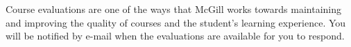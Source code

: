 Course evaluations are one of the ways that McGill works towards
maintaining and improving the quality of courses and the student’s
learning experience. You will be notified by e-mail when the
evaluations are available for you to respond.
